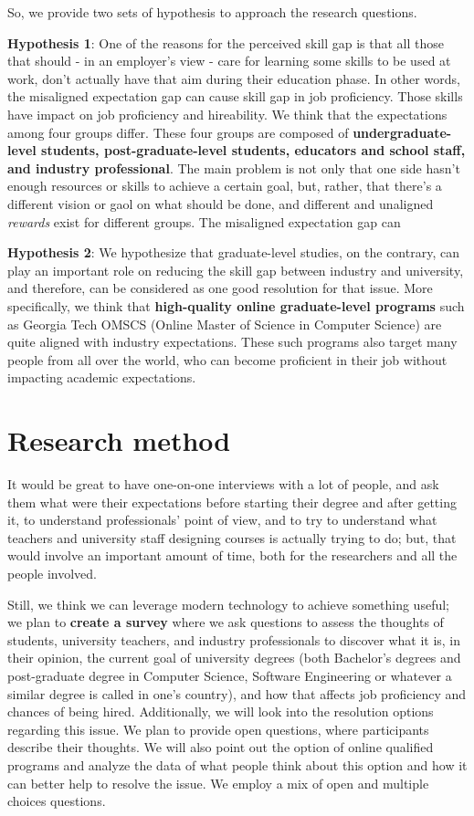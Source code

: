 \documentclass{sigchi}
\begin{document}
So, we provide two sets of hypothesis to approach the research questions.

\textbf{Hypothesis 1}: One of the reasons for the perceived skill gap is that all those that should - in an employer's view - care for learning some skills to be used at work, don't actually have that aim during their education phase. In other words, the misaligned expectation gap can cause skill gap in job proficiency. Those skills have impact on job proficiency and hireability. We think that the expectations among four groups differ. These four groups are composed of \textbf{undergraduate-level students, post-graduate-level students, educators and school staff, and industry professional}. The main problem is not only that one side hasn’t enough resources or skills to achieve a certain goal, but, rather, that there’s a different vision or gaol on what should be done, and different and unaligned \textit{rewards} exist for different groups. The misaligned expectation gap can 

\textbf{Hypothesis 2}: We hypothesize that graduate-level studies, on the contrary, can play an important role on reducing the skill gap between industry and university, and therefore, can be considered as one good resolution for that issue. More specifically, we think that \textbf{high-quality online graduate-level programs} such as Georgia Tech OMSCS (Online Master of Science in Computer Science) are quite aligned with industry expectations. These such programs also target many people from all over the world, who can become proficient in their job without impacting academic expectations.

\section{Research method}
It would be great to have one-on-one interviews with a lot of people, and ask them what were their expectations before starting their degree and after getting it, to understand professionals' point of view, and to try to understand what teachers and university staff designing courses is actually trying to do; but, that would involve an important amount of time, both for the researchers and all the people involved.

Still, we think we can leverage modern technology to achieve something useful; we plan to \textbf{create a survey} where we ask questions to assess the thoughts of students, university teachers, and industry professionals to discover what it is, in their opinion, the current goal of university degrees (both Bachelor's degrees and post-graduate degree in Computer Science, Software Engineering or whatever a similar degree is called in one's country), and how that affects job proficiency and chances of being hired. Additionally, we will look into the resolution options regarding this issue. We plan to provide open questions, where participants describe their thoughts. We will also point out the option of online qualified programs and analyze the data of what people think about this option and how it can better help to resolve the issue. We employ a mix of open and multiple choices questions.
\end{document}
